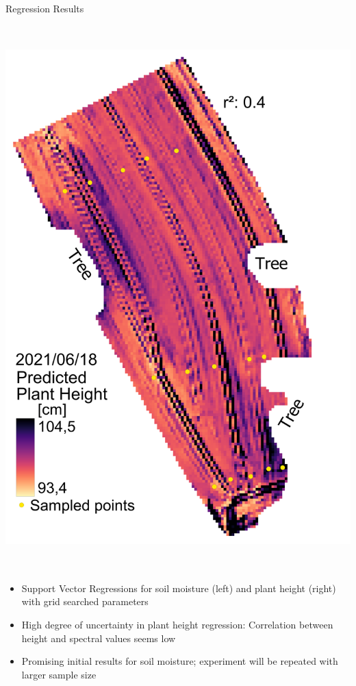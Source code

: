 \documentclass[final,hyperref={pdfpagelabels=false}]{beamer}
\begin{document}
\begin{frame}
\begin{minipage}[t][][t]{0.48\paperwidth}
\begin{block}{Regression Results}
\begin{minipage}{0.14\paperwidth}
    \includegraphics[height=21cm]{pics/svr_20210618_height.png}
\end{minipage}
\begin{minipage}{0.15\paperwidth}
\small{
    \begin{itemize}
        \item Support Vector Regressions for soil moisture (left) and plant height (right) with grid searched parameters
        \item High degree of uncertainty in plant height regression: Correlation between height and spectral values seems low
        \item Promising initial results for soil moisture; experiment will be repeated with larger sample size
    \end{itemize}
    }
\end{minipage}
\end{block}
\end{minipage}


\end{frame}
\end{document}
